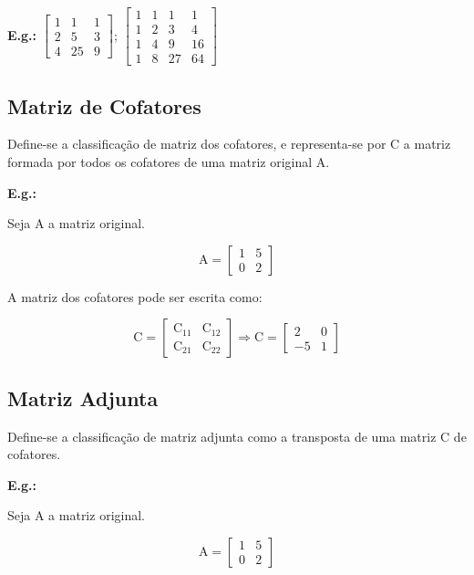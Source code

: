 \documentclass[a4paper,12pt]{article}
\begin{document}
\textbf{E.g.:} $ \begin{bmatrix}
1 & 1 & 1 \\
2 & 5 & 3 \\
4 & 25 & 9
\end{bmatrix} $; $ \begin{bmatrix}
 1 & 1 & 1 & 1 \\
 1 & 2 & 3 & 4 \\
 1 & 4 & 9 & 16 \\
 1 & 8 & 27 & 64
\end{bmatrix} $

\subsection{Matriz de Cofatores}

Define-se a classificação de matriz dos cofatores, e representa-se por $ \text{C} $ a matriz formada por todos os cofatores de uma matriz original $ \text{A} $.

\textbf{E.g.:}

Seja $ \text{A} $ a matriz original.

 $$ \text{A} = \begin{bmatrix}
1 & 5 \\
0 & 2
\end{bmatrix} $$

A matriz dos cofatores pode ser escrita como:

$$ \text{C} = \begin{bmatrix}
\text{C}_{11} & \text{C}_{12}\\
\text{C}_{21} & \text{C}_{22}
\end{bmatrix} \Rightarrow \text{C} = \begin{bmatrix}
2 & 0 \\
-5 & 1
\end{bmatrix} $$

\subsection{Matriz Adjunta}

Define-se a classificação de matriz adjunta como a transposta de uma matriz $ \text{C} $ de cofatores.

\textbf{E.g.:}

Seja $ \text{A} $ a matriz original.

 $$ \text{A} = \begin{bmatrix}
1 & 5 \\
0 & 2
\end{bmatrix} $$
\end{document}
